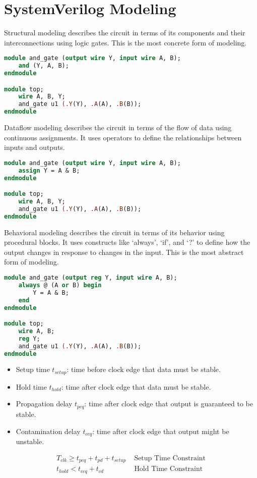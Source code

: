 \documentclass[8pt]{article}
\begin{document}
\section*{SystemVerilog Modeling}
Structural modeling describes the circuit in terms of its
components and their interconnections using logic gates. This
is the most concrete form of modeling.
\begin{lstlisting}[language=SystemVerilog, caption=Structural Modeling Example]
module and_gate (output wire Y, input wire A, B);
    and (Y, A, B);
endmodule

module top;
    wire A, B, Y;
    and_gate u1 (.Y(Y), .A(A), .B(B));
endmodule
\end{lstlisting}
Dataflow modeling describes the circuit in terms of the
flow of data using continuous assignments. It uses
operators to define the relationships between inputs
and outputs.
\begin{lstlisting}[language=SystemVerilog, caption=Dataflow Modeling Example]
module and_gate (output wire Y, input wire A, B);
    assign Y = A & B;
endmodule

module top;
    wire A, B, Y;
    and_gate u1 (.Y(Y), .A(A), .B(B));
endmodule
\end{lstlisting}
Behavioral modeling describes the circuit in terms of its
behavior using procedural blocks. It uses constructs like
`always', `if', and `?' to define how the output changes in
response to changes in the input. This is the most
abstract form of modeling.
\begin{lstlisting}[language=SystemVerilog, caption=Behavioral Modeling Example]
module and_gate (output reg Y, input wire A, B);
    always @ (A or B) begin
        Y = A & B;
    end
endmodule

module top;
    wire A, B;
    reg Y;
    and_gate u1 (.Y(Y), .A(A), .B(B));
endmodule
\end{lstlisting}

\begin{itemize}
    \item Setup time $t_{setup}$: time before clock edge that data must be
          stable.
    \item Hold time $t_{hold}$: time after clock edge that data must be stable.
    \item Propagation delay $t_{pcq}$: time after clock edge that output
          is guaranteed to be stable.
    \item Contamination delay $t_{ccq}$: time after clock edge that output
          might be unstable.
\end{itemize}

\begin{align}
    T_{clk} \geq t_{pcq} + t_{pd} + t_{setup} & \text{ Setup Time Constraint} \\
    t_{hold} < t_{ccq} + t_{cd}               & \text{ Hold Time Constraint}
\end{align}
\end{document}
